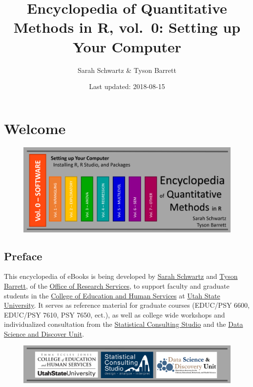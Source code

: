 \documentclass[]{book}
\title{Encyclopedia of Quantitative Methods in R, vol.~0: Setting up Your
Computer}
\author{Sarah Schwartz \& Tyson Barrett}
\date{Last updated: 2018-08-15}
\begin{document}
\maketitle

{
\setcounter{tocdepth}{1}
\tableofcontents
}
\chapter*{Welcome}\label{welcome}

\begin{figure}
\centering
\includegraphics{images/EQM_img/EQM_v0_header.png}
\caption{}
\end{figure}

\section*{Preface}\label{preface}

This encyclopedia of eBooks is being developed by
\href{http://www.sarahschwartzstats.com/}{Sarah Schwartz} and
\href{http://tysonbarrett.com/}{Tyson Barrett}, of the
\href{https://cehs.usu.edu/research/index}{Office of Research Services},
to support faculty and graduate students in the
\href{https://cehs.usu.edu/}{College of Education and Human Services} at
\href{http://www.usu.edu/}{Utah State University}. It serves as
reference material for graduate courses (EDUC/PSY 6600, EDUC/PSY 7610,
PSY 7650, ect.), as well as college wide workshops and individualized
consultation from the
\href{https://cehs.usu.edu/research/statstudio/index}{Statistical
Consulting Studio} and the
\href{https://cehs.usu.edu/research/dsdu/index}{Data Science and
Discover Unit}.

\begin{figure}
\centering
\includegraphics{images/cehs_statstudio_dsdu.PNG}
\caption{}
\end{figure}
\end{document}
